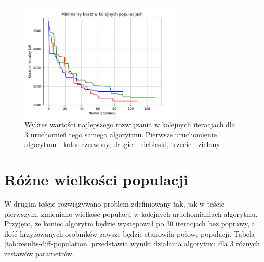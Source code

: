 \documentclass[12pt, oneside, final]{report}
\begin{document}
\begin{figure}[ht!]
\centering
\includegraphics[width=0.7\textwidth]{graphics/same-problem-same-algorithm}
\caption{Wykres wartości najlepszego rozwiązania w kolejnych iteracjach dla 3 uruchomień tego samego algorytmu. Pierwsze uruchomienie algorytmu - kolor czerwony, drugie - niebieski, trzecie - zielony}
\label{fig:same-problem-same-algorithm}
\end{figure}

\section{Różne wielkości populacji}
W drugim teście rozwiązywano problem zdefiniowany tak, jak w teście pierwszym, zmieniano wielkość populacji w kolejnych uruchomianiach algorytmu. Przyjęto, że koniec algorytm będzie występował po 30 iteracjach bez poprawy, a ilość krzyżowanych osobników zawsze będzie stanowiła połowę populacji. Tabela \ref{tab:results-diff-population} przedstawia wyniki działania algorytmu dla 3 różnych zestawów parametrów.
\end{document}
